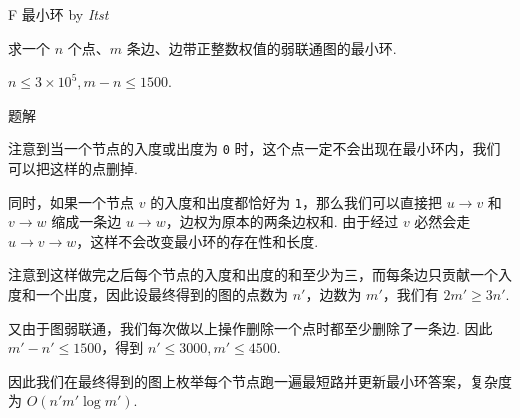 \begin{frame}{F 最小环 {by \itshape Itst}}

	求一个 $n$ 个点、$m$ 条边、边带正整数权值的弱联通图的最小环.

	$n\le 3\times 10^5, m-n\le 1500$.

\end{frame}

\begin{frame}{题解}

	注意到当一个节点的入度或出度为 \texttt{0} 时，这个点一定不会出现在最小环内，我们可以把这样的点删掉.

	同时，如果一个节点 $v$ 的入度和出度都恰好为 \texttt{1}，那么我们可以直接把 $u\rightarrow v$ 和 $v\rightarrow w$ 缩成一条边 $u\rightarrow w$，边权为原本的两条边权和. 由于经过 $v$ 必然会走 $u\rightarrow v\rightarrow w$，这样不会改变最小环的存在性和长度.

	注意到这样做完之后每个节点的入度和出度的和至少为三，而每条边只贡献一个入度和一个出度，因此设最终得到的图的点数为 $n'$，边数为 $m'$，我们有 $2m'\ge 3n'$.

	又由于图弱联通，我们每次做以上操作删除一个点时都至少删除了一条边. 因此 $m'-n'\le 1500$，得到 $n'\le 3000, m'\le 4500$.

	因此我们在最终得到的图上枚举每个节点跑一遍最短路并更新最小环答案，复杂度为 $O(n'm'\log {m'})$.

\end{frame}
